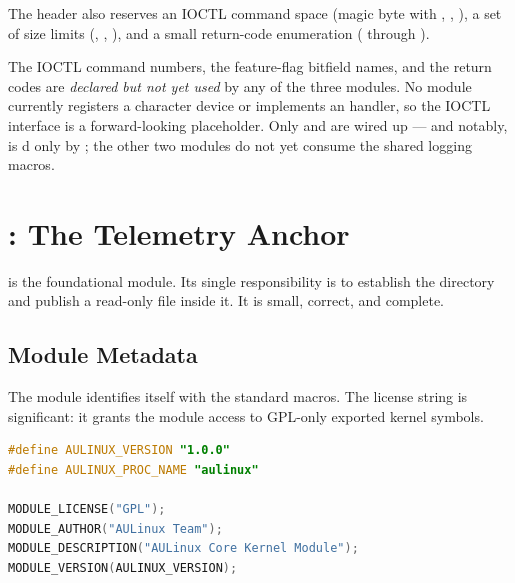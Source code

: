 The header also reserves an IOCTL command space (magic byte  with
, , ), a set of size
limits (, ,
), and a small return-code enumeration
( through ).

\begin{notebox}
The IOCTL command numbers, the feature-flag bitfield names, and the
 return codes are \emph{declared but not yet used} by any
of the three modules. No module currently registers a character device or
implements an  handler, so the IOCTL interface is a
forward-looking placeholder. Only  and
 are wired up — and notably, 
is d only by ; the other two modules do
not yet consume the shared logging macros.
\end{notebox}

\section{: The Telemetry Anchor}

 is the foundational module. Its single responsibility is
to establish the  directory and publish a read-only
 file inside it. It is small, correct, and complete.

\subsection{Module Metadata}

The module identifies itself with the standard  macros. The
license string  is significant: it grants the module access to
GPL-only exported kernel symbols.

\begin{lstlisting}[language=C, caption={Module metadata (aulinux\_core.c, lines 16--22)}]
#define AULINUX_VERSION "1.0.0"
#define AULINUX_PROC_NAME "aulinux"

MODULE_LICENSE("GPL");
MODULE_AUTHOR("AULinux Team");
MODULE_DESCRIPTION("AULinux Core Kernel Module");
MODULE_VERSION(AULINUX_VERSION);
\end{lstlisting}

